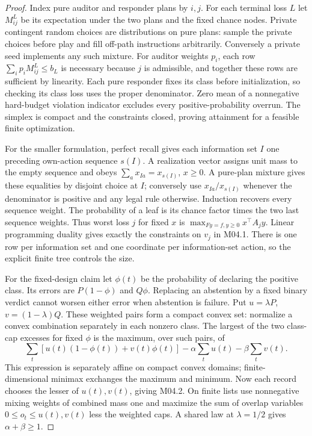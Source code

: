 \begin{proof}

Index pure auditor and responder plans by \(i,j\). For each terminal loss \(L\) let \(M^L_{ij}\) be its expectation under the two plans and the fixed chance nodes. Private contingent random choices are distributions on pure plans: sample the private choices before play and fill off-path instructions arbitrarily. Conversely a private seed implements any such mixture. For auditor weights \(p_i\), each row \(\sum_i p_iM^L_{ij}\le b_L\) is necessary because \(j\) is admissible, and together these rows are sufficient by linearity. Each pure responder fixes its class before initialization, so checking its class loss uses the proper denominator. Zero mean of a nonnegative hard-budget violation indicator excludes every positive-probability overrun. The simplex is compact and the constraints closed, proving attainment for a feasible finite optimization.

For the smaller formulation, perfect recall gives each information set \(I\) one preceding own-action sequence \(s(I)\). A realization vector assigns unit mass to the empty sequence and obeys \(\sum_a x_{Ia}=x_{s(I)}\), \(x\ge0\). A pure-plan mixture gives these equalities by disjoint choice at \(I\); conversely use \(x_{Ia}/x_{s(I)}\) whenever the denominator is positive and any legal rule otherwise. Induction recovers every sequence weight. The probability of a leaf is its chance factor times the two last sequence weights. Thus worst loss \(j\) for fixed \(x\) is \(\max_{Fy=f,y\ge0}x^\top A_jy\). Linear programming duality gives exactly the constraints on \(v_j\) in M04.1. There is one row per information set and one coordinate per information-set action, so the explicit finite tree controls the size.

For the fixed-design claim let \(\phi(t)\) be the probability of declaring the positive class. Its errors are \(P(1-\phi)\) and \(Q\phi\). Replacing an abstention by a fixed binary verdict cannot worsen either error when abstention is failure. Put \(u=\lambda P\), \(v=(1-\lambda)Q\). These weighted pairs form a compact convex set: normalize a convex combination separately in each nonzero class. The largest of the two class-cap excesses for fixed \(\phi\) is the maximum, over such pairs, of
\[
\sum_t [u(t)(1-\phi(t))+v(t)\phi(t)]-\alpha\sum_tu(t)-\beta\sum_tv(t).
\]
This expression is separately affine on compact convex domains; finite-dimensional minimax exchanges the maximum and minimum. Now each record chooses the lesser of \(u(t),v(t)\), giving M04.2. On finite lists use nonnegative mixing weights of combined mass one and maximize the sum of overlap variables \(0\le o_t\le u(t),v(t)\) less the weighted caps. A shared law at \(\lambda=1/2\) gives \(\alpha+\beta\ge1\).


\end{proof}
